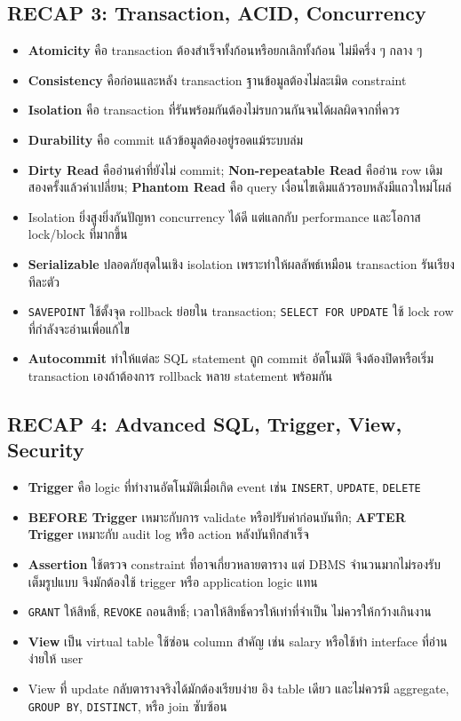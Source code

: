 \documentclass[a4paper,12pt]{article}
\begin{document}
\subsection*{RECAP 3: Transaction, ACID, Concurrency}
\begin{itemize}
    \item \textbf{Atomicity} คือ transaction ต้องสำเร็จทั้งก้อนหรือยกเลิกทั้งก้อน ไม่มีครึ่ง ๆ กลาง ๆ
    \item \textbf{Consistency} คือก่อนและหลัง transaction ฐานข้อมูลต้องไม่ละเมิด constraint
    \item \textbf{Isolation} คือ transaction ที่รันพร้อมกันต้องไม่รบกวนกันจนได้ผลผิดจากที่ควร
    \item \textbf{Durability} คือ commit แล้วข้อมูลต้องอยู่รอดแม้ระบบล่ม
    \item \textbf{Dirty Read} คืออ่านค่าที่ยังไม่ commit; \textbf{Non-repeatable Read} คืออ่าน row เดิมสองครั้งแล้วค่าเปลี่ยน; \textbf{Phantom Read} คือ query เงื่อนไขเดิมแล้วรอบหลังมีแถวใหม่โผล่
    \item Isolation ยิ่งสูงยิ่งกันปัญหา concurrency ได้ดี แต่แลกกับ performance และโอกาส lock/block ที่มากขึ้น
    \item \textbf{Serializable} ปลอดภัยสุดในเชิง isolation เพราะทำให้ผลลัพธ์เหมือน transaction รันเรียงทีละตัว
    \item \texttt{SAVEPOINT} ใช้ตั้งจุด rollback ย่อยใน transaction; \texttt{SELECT FOR UPDATE} ใช้ lock row ที่กำลังจะอ่านเพื่อแก้ไข
    \item \textbf{Autocommit} ทำให้แต่ละ SQL statement ถูก commit อัตโนมัติ จึงต้องปิดหรือเริ่ม transaction เองถ้าต้องการ rollback หลาย statement พร้อมกัน
\end{itemize}

\subsection*{RECAP 4: Advanced SQL, Trigger, View, Security}
\begin{itemize}
    \item \textbf{Trigger} คือ logic ที่ทำงานอัตโนมัติเมื่อเกิด event เช่น \texttt{INSERT}, \texttt{UPDATE}, \texttt{DELETE}
    \item \textbf{BEFORE Trigger} เหมาะกับการ validate หรือปรับค่าก่อนบันทึก; \textbf{AFTER Trigger} เหมาะกับ audit log หรือ action หลังบันทึกสำเร็จ
    \item \textbf{Assertion} ใช้ตรวจ constraint ที่อาจเกี่ยวหลายตาราง แต่ DBMS จำนวนมากไม่รองรับเต็มรูปแบบ จึงมักต้องใช้ trigger หรือ application logic แทน
    \item \texttt{GRANT} ให้สิทธิ์, \texttt{REVOKE} ถอนสิทธิ์; เวลาให้สิทธิ์ควรให้เท่าที่จำเป็น ไม่ควรให้กว้างเกินงาน
    \item \textbf{View} เป็น virtual table ใช้ซ่อน column สำคัญ เช่น salary หรือใช้ทำ interface ที่อ่านง่ายให้ user
    \item View ที่ update กลับตารางจริงได้มักต้องเรียบง่าย อิง table เดียว และไม่ควรมี aggregate, \texttt{GROUP BY}, \texttt{DISTINCT}, หรือ join ซับซ้อน
\end{itemize}
\end{document}

